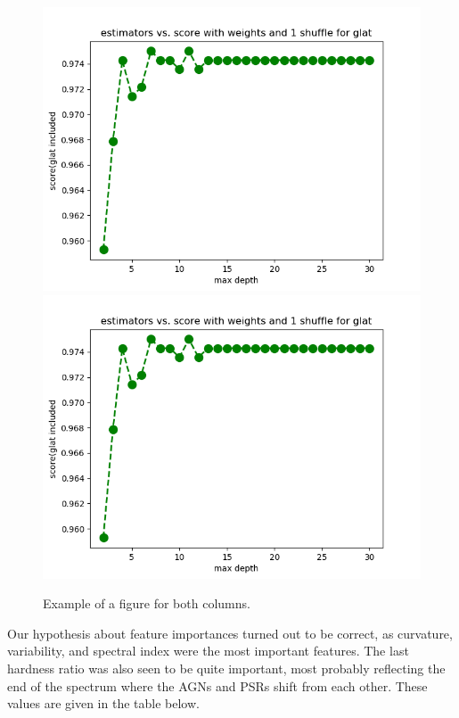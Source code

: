 \begin{figure}[h]
\includegraphics[width=\twopicsp\textwidth]{plots/Rf_maxdepth_oobscore_glat}
\includegraphics[width=\twopicsp\textwidth]{plots/Rf_maxdepth_oobscore_glat}
\caption{
Example of a figure for both columns.
}
\label{fig:Maps_data}
\end{figure}

Our hypothesis about feature importances turned out to be correct, as curvature, variability, and spectral index were the most important features. The last hardness ratio was also seen to be quite important, most probably reflecting the end of the spectrum where the AGNs and PSRs shift from each other. These values are given in the table below. \\

